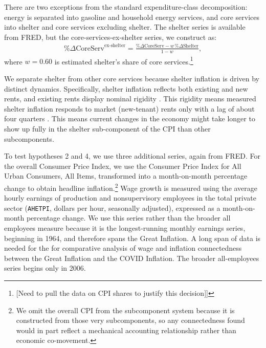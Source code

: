 \documentclass{article}
\begin{document}
There are two exceptions from the standard expenditure-class decomposition: energy is separated into gasoline and household energy services, and core services into shelter and core services excluding shelter. The shelter series is available from FRED, but the core-services-ex-shelter series, we construct as:
\begin{align}
\%\Delta\text{CoreServ}^{\text{ex-shelter}}
  = \frac{\%\Delta\text{CoreServ} - w\,\%\Delta\text{Shelter}}{1-w},
\end{align}
where $w=0.60$ is estimated shelter's share of core services.\footnote{[Need to pull the data on CPI shares to justify this decision]]}

We separate shelter from other core services because shelter inflation is driven by distinct dynamics. Specifically, shelter inflation reflects both existing and new rents, and existing rents display nominal rigidity  \citep{genesove2003}.  This rigidity means measured shelter inflation responds to market (new-tenant) rents only with a lag of about four quarters \citep{adamsetal2024}. This means current changes in the economy might take longer to show up fully in the shelter sub-component of the CPI than other subcomponents.


To test hypotheses 2 and 4, we use three additional series, again from FRED. For the overall Consumer
Price Index, we use the Consumer Price Index for All Urban Consumers, All Items, transformed into a
month-on-month percentage change to obtain headline inflation.\footnote{We omit the overall CPI from the subcomponent system because it is constructed from those very subcomponents, so any connectedness found would in part reflect a mechanical accounting relationship rather than economic co-movement.} Wage growth is measured using the average hourly earnings of production and nonsupervisory employees in the total private sector
(\texttt{AHETPI}, dollars per hour, seasonally adjusted), expressed as a
month-on-month percentage change. We use this series rather than the broader
all employees measure because it is the longest-running monthly earnings series,
beginning in 1964, and therefore spans the Great Inflation. A long span of data is needed for the
for comparative analysis of wage and inflation connectedness between the Great Inflation and the COVID Inflation. The broader
all-employees series begins only in 2006.
\end{document}
